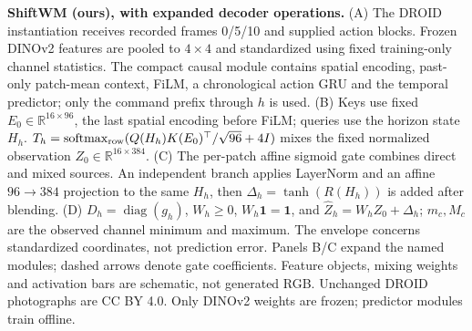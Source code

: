 \textbf{ShiftWM (ours), with expanded decoder operations.} (A) The DROID instantiation receives recorded frames 0/5/10 and supplied action blocks. Frozen DINOv2 features are pooled to $4\!\times\!4$ and standardized using fixed training-only channel statistics. The compact causal module contains spatial encoding, past-only patch-mean context, FiLM, a chronological action GRU and the temporal predictor; only the command prefix through $h$ is used. (B) Keys use fixed $E_0\in\mathbb R^{16\times96}$, the last spatial encoding before FiLM; queries use the horizon state $H_h$. $T_h=\operatorname{softmax}_{\rm row}(Q(H_h)K(E_0)^\top/\sqrt{96}+4I)$ mixes the fixed normalized observation $Z_0\in\mathbb R^{16\times384}$. (C) The per-patch affine sigmoid gate combines direct and mixed sources. An independent branch applies LayerNorm and an affine $96\!\to\!384$ projection to the same $H_h$, then $\Delta_h=\tanh(R(H_h))$ is added after blending. (D) $D_h=\operatorname{diag}(g_h)$, $W_h\geq0$, $W_h\mathbf1=\mathbf1$, and $\hat Z_h=W_hZ_0+\Delta_h$; $m_c,M_c$ are the observed channel minimum and maximum. The envelope concerns standardized coordinates, not prediction error. Panels B/C expand the named modules; dashed arrows denote gate coefficients. Feature objects, mixing weights and activation bars are schematic, not generated RGB. Unchanged DROID photographs are CC BY 4.0. Only DINOv2 weights are frozen; predictor modules train offline.
